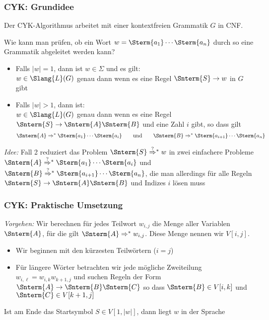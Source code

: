 \documentclass[aspectratio=1610,onlymath]{beamer}
\begin{document}
\maketitle


\newcommand{\Rightarrowstarquest}{\mathrel{{\stackrel{?}{\Rightarrow}}{}^*}}

\begin{frame}\frametitle{CYK: Grundidee}

Der CYK-Algorithmus arbeitet mit einer kontextfreien Grammatik $G$ in CNF.
\bigskip

\alert{Wie kann man prüfen, ob ein Wort $w=\Sterm{a_1}\cdots\Sterm{a_n}$ durch so eine Grammatik abgeleitet werden kann?}


\begin{itemize}
\item Falls $|w|=1$, dann ist $w\in\Sigma$ und es gilt:\\
$w\in\Slang{L}(G)$ genau dann wenn es eine Regel $\Snterm{S}\to w$ in $G$ gibt
\item Falls $|w|>1$, dann ist:\\
$w\in\Slang{L}(G)$ genau dann wenn es eine Regel
$\Snterm{S}\to\Snterm{A}\Snterm{B}$ und eine Zahl $i$ gibt, so dass gilt
\[\Snterm{A}\Rightarrow^* \Sterm{a_1}\cdots\Sterm{a_i}\qquad\text{und}\qquad \Snterm{B}\Rightarrow^* \Sterm{a_{i+1}}\cdots\Sterm{a_n}\]
\end{itemize}

\emph{Idee:} Fall 2 reduziert das Problem $\Snterm{S}\Rightarrowstarquest w$ in zwei einfachere Probleme
$\Snterm{A}\Rightarrowstarquest \Sterm{a_1}\cdots\Sterm{a_i}$ und $\Snterm{B}\Rightarrowstarquest \Sterm{a_{i+1}}\cdots\Sterm{a_n}$, die man allerdings für alle Regeln $\Snterm{S}\to\Snterm{A}\Snterm{B}$ und Indizes $i$ lösen muss

\end{frame}

\begin{frame}\frametitle{CYK: Praktische Umsetzung}


\emph{Vorgehen:} Wir berechnen für jedes Teilwort $w_{i,j}$ die Menge aller Variablen $\Snterm{A}$, für
die gilt $\Snterm{A}\Rightarrow^* w_{i,j}$. Diese Menge nennen wir $V[i,j]$.
\begin{itemize}
\item Wir beginnen mit den kürzesten Teilwörtern ($i=j$)
\item Für längere Wörter betrachten wir jede mögliche Zweiteilung $w_{i,\ell}=w_{i,k}w_{k+1,j}$ und suchen Regeln der Form $\Snterm{A}\to\Snterm{B}\Snterm{C}$ so dass $\Snterm{B}\in V[i,k]$ und $\Snterm{C}\in V[k+1,j]$
\end{itemize}
Ist am Ende das Startsymbol $S\in V[1,|w|]$, dann liegt $w$ in der Sprache

\end{frame}
\end{document}
